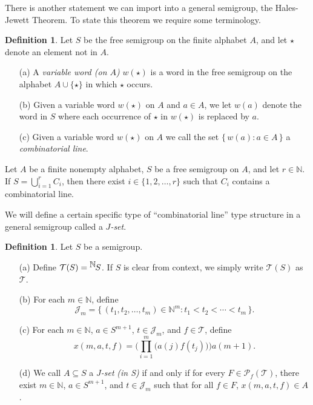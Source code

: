 \documentclass[12pt]{article}
\theoremstyle{plain}
\theoremstyle{definition}
\newtheorem{defn}[thm]{Definition}
\newcommand{\bbN}{\mathbb{N}}
\newcommand{\calJ}{\mathcal{J}}
\newcommand{\calT}{\mathcal{T}}
\newcommand{\Pf}{\mathcal{P}_f}
\newcommand{\setfunc}[2]{\hbox{${}^{\hbox{$#1$}}\hskip -1 pt #2$}}
\begin{document}
There is another statement we can import into a general semigroup, the
Hales-Jewett Theorem.
To state this theorem we require some terminology. 

\begin{defn}
  Let $S$ be the free semigroup on the finite alphabet $A$, and let
  $\star$ denote an element not in $A$.
  \begin{itemize}
    \item[(a)] A \textsl{variable word (on $A$)} $w(\star)$ is a word in the
      free semigroup on the alphabet $A \cup \{\star\}$ in which
      $\star$ occurs.

    \item[(b)] Given a variable word $w(\star)$ on $A$ and $a \in A$,
      we let $w(a)$ denote the word in $S$ where each occurrence of
      $\star$ in $w(\star)$ is replaced by $a$.

    \item[(c)] Given a variable word $w(\star)$ on $A$ we call the set
      $\{\, w(a) : a \in A \,\}$ a \textsl{combinatorial line}.
  \end{itemize}
\end{defn}

\begin{hj}
  Let $A$ be a finite nonempty alphabet, $S$ be a free semigroup on
  $A$, and let $r \in \bbN$.
  If $S = \bigcup_{i=1}^r C_i$, then there exist $i \in \{1, 2,
  \ldots, r\}$ such that $C_i$ contains a combinatorial line. 
\end{hj}

We will define a certain specific type of ``combinatorial line'' type
structure in a general semigroup called a \textsl{$J$-set}.

\begin{defn}
  Let $S$ be a semigroup. 
  \begin{itemize}
    \item[(a)] Define $\calT(S) = \setfunc{\bbN}{S}$.
      If $S$ is clear from context, we simply write $\calT(S)$ as
      $\calT$.

    \item[(b)] For each $m \in \bbN$, define
      \[
        \calJ_m = \{\, (t_1, t_2, \ldots, t_m) \in \bbN^m : t_1 < t_2
        < \cdots < t_m \,\}.
      \]

    \item[(c)] For each $m \in \bbN$, $a \in S^{m+1}$, $t \in
      \calJ_m$, and $f \in \calT$, define
      \[
        x(m, a, t, f) = \biggl(\prod_{i=1}^m \bigl( a(j) f(t_j) \bigr)
        \biggr) a(m+1).
      \]

    \item[(d)] We call $A \subseteq S$ a \textsl{$J$-set}%
      \textsl{(in S)} if and only if for every $F \in \Pf(\calT)$,
      there exist $m \in \bbN$, $a \in S^{m+1}$, and $t \in \calJ_m$
      such that for all $f  \in F$, $x(m, a, t, f) \in A$. 
  \end{itemize}
\end{defn}
\end{document}
